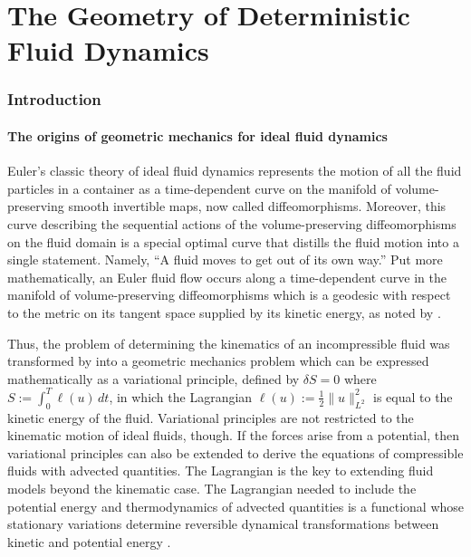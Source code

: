 \documentclass[11pt, oneside]{article}   	%
\numberwithin{equation}{section}
\theoremstyle{plain}
\theoremstyle{definition}
\theoremstyle{remark}
\newcommand{\<}{\langle}
\renewcommand{\>}{\rangle}
\begin{document}
\tableofcontents

\part{The Geometry of Deterministic Fluid Dynamics}
\section{Introduction} %
\subsection{The origins of geometric mechanics for ideal fluid dynamics}

Euler's classic theory of ideal fluid dynamics represents the motion of all the fluid particles in a container as a time-dependent curve on the manifold of volume-preserving smooth invertible maps, now called diffeomorphisms. Moreover, this curve describing the sequential actions of the volume-preserving diffeomorphisms on the fluid domain is a special optimal curve that distills the fluid motion into a single statement. Namely, ``A fluid moves to get out of its own way.'' Put more mathematically, an Euler fluid flow occurs along a time-dependent curve in the manifold of volume-preserving diffeomorphisms which is a geodesic with respect to the metric on its tangent space supplied by its kinetic energy, as noted by \cite{arnold1966geometrie}.


Thus, the problem of determining the kinematics of an incompressible fluid was transformed by \cite{arnold1966geometrie} into a geometric mechanics problem which can be expressed mathematically as a variational principle, defined by $\delta S=0$ where $S:=\int_0^T\ell(u)\,dt$, in which the Lagrangian $\ell(u):=\tfrac12\|u\|_{L^2}^2$ is equal to the kinetic energy of the fluid. Variational principles are not restricted to the kinematic motion of ideal fluids, though. If the forces arise from a potential, then variational principles can also be extended to derive the equations of compressible fluids with advected quantities. The Lagrangian is the key to extending fluid models beyond the kinematic case. The Lagrangian needed to include the potential energy and thermodynamics of advected quantities is a functional whose stationary variations determine reversible dynamical transformations between kinetic and potential energy \cite{HMR1998}. 
\end{document}
